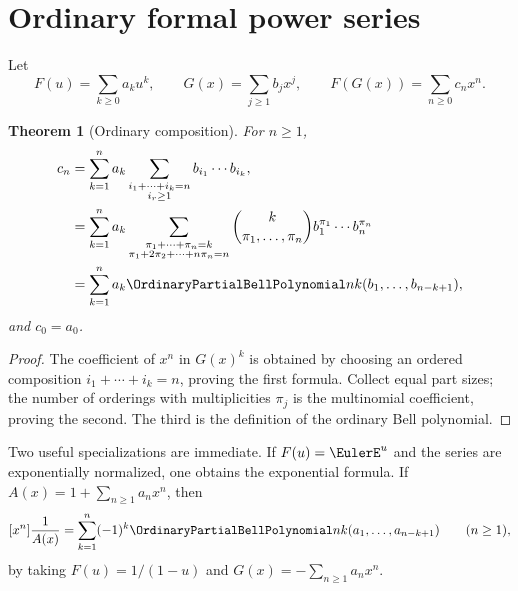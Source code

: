 \documentclass[11pt,a4paper,oneside,openany]{book}
\newtheorem{theorem}{Theorem}[chapter]
\theoremstyle{definition}
\theoremstyle{remark}
\begin{document}
\section{Ordinary formal power series}
Let
\[
 F(u)=\sum_{k\ge0}a_ku^k,
 \qquad
 G(x)=\sum_{j\ge1}b_jx^j,
 \qquad
 F(G(x))=\sum_{n\ge0}c_nx^n.
\]
\begin{theorem}[Ordinary composition]\label{thm:ordinary-composition}
For $n\ge1$,
\begin{align}
 c_n&=\sum_{k=1}^{n}a_k
 \sum_{\substack{i_1+\cdots+i_k=n\\i_r\ge1}}
 b_{i_1}\cdots b_{i_k},
 \label{eq:ordinary-composition-compositions}\\
 &=\sum_{k=1}^{n}a_k
 \sum_{\substack{\pi_1+\cdots+\pi_n=k\\
                   \pi_1+2\pi_2+\cdots+n\pi_n=n}}
 \binom{k}{\pi_1,\ldots,\pi_n}
 b_1^{\pi_1}\cdots b_n^{\pi_n}
 \label{eq:ordinary-composition-multiplicities}\\
 &=\sum_{k=1}^{n}a_k\OrdinaryPartialBellPolynomial nk(b_1,\ldots,b_{n-k+1}),
 \label{eq:ordinary-composition-bell}
\end{align}
and $c_0=a_0$.
\end{theorem}
\begin{proof}
The coefficient of $x^n$ in $G(x)^k$ is obtained by choosing an ordered
composition $i_1+\cdots+i_k=n$, proving the first formula.  Collect equal part
sizes; the number of orderings with multiplicities $\pi_j$ is the multinomial
coefficient, proving the second.  The third is the definition of the ordinary
Bell polynomial.
\end{proof}

Two useful specializations are immediate.  If $F(u)=\EulerE^u$ and the series are
exponentially normalized, one obtains the exponential formula.  If
$A(x)=1+\sum_{n\ge1}a_nx^n$, then
\begin{equation}\label{eq:reciprocal-ordinary-bell}
 [x^n]\frac1{A(x)}
 =\sum_{k=1}^{n}(-1)^k\OrdinaryPartialBellPolynomial nk(a_1,\ldots,a_{n-k+1})
 \qquad(n\ge1),
\end{equation}
by taking $F(u)=1/(1-u)$ and $G(x)=-\sum_{n\ge1}a_nx^n$.
\end{document}

